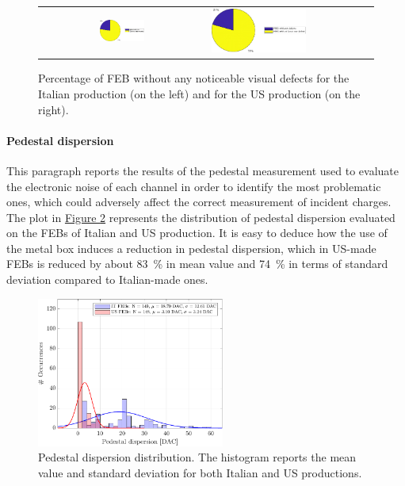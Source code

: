 \begin{figure}[h!]
    \centering
    \begin{tabular}{c p{8.6cm}}
        \includegraphics[width=0.285\textwidth]{Images/chap2/results/defects_number_IT.pdf} & \includegraphics[width=0.6\textwidth]{Images/chap2/results/defects_number_US.pdf}\\
    \end{tabular}
    \caption{Percentage of FEB without any noticeable visual defects for the Italian production (on the left) and for the US production (on the right).}
    \label{figFEBdefects2}
\end{figure}

\paragraph{Pedestal dispersion} This paragraph reports the results of the pedestal measurement used to evaluate the electronic noise of each channel in order to identify the most problematic ones, which could adversely affect the correct measurement of incident charges. The plot in \hyperref[figFEBpedestal]{Figure \ref{figFEBpedestal}} represents the distribution of pedestal dispersion evaluated on the FEBs of Italian and US production. It is easy to deduce how the use of the metal box induces a reduction in pedestal dispersion, which in US-made FEBs is reduced by about \SI{83}{\percent} in mean value and \SI{74}{\percent} in terms of standard deviation compared to Italian-made ones.

\begin{figure}[h!]
    \centering
    \includegraphics[width=0.55\textwidth]{Images/chap2/results/ped_disp.pdf}
    \caption{Pedestal dispersion distribution. The histogram reports the mean value and standard deviation for both Italian and US productions.}
    \label{figFEBpedestal}
\end{figure}

